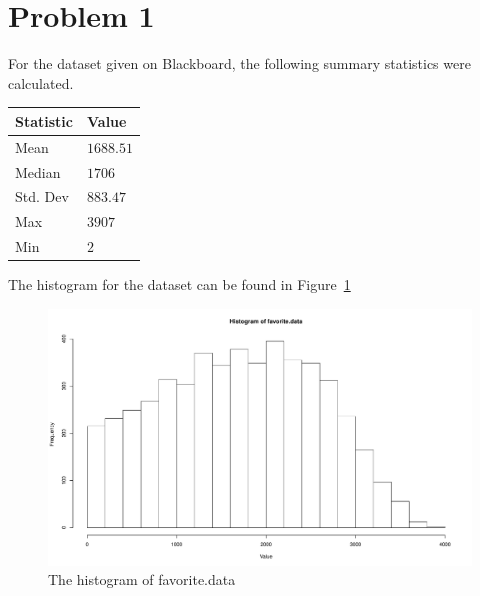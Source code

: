 \documentclass{amsart}
\begin{document}
\section{Problem 1}
For the dataset given on Blackboard, the following summary statistics were calculated.

\begin{table}[H]
\centering
\begin{tabular}{ll}
  \hline
Statistic & Value \\
  \hline
Mean & $1688.51$ \\
Median & $1706$ \\
Std. Dev & $883.47$ \\
Max & $3907$ \\
Min & $2$ \\
   \hline
\end{tabular}
\end{table}

The histogram for the dataset can be found in Figure~\ref{fig:p1a}

\begin{figure}[H]
  \centering
  \includegraphics[width=\linewidth]{problem1_histogram.pdf}
  \caption{The histogram of favorite.data}
  \label{fig:p1a}
\end{figure}
\end{document}
